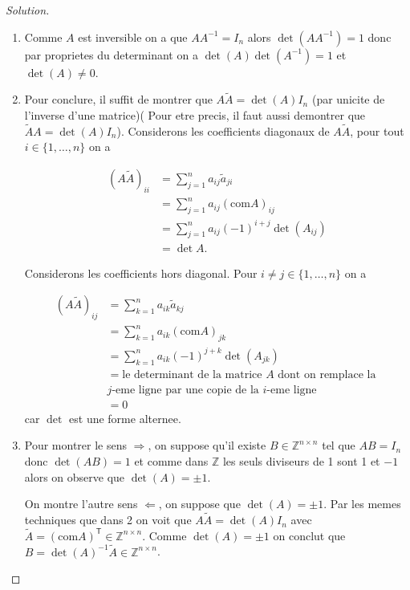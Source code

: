 \documentclass[a4paper,12pt,french]{report}
\theoremstyle{plain}
\theoremstyle{definition}
\begin{document}
\begin{proof}[Solution]
\begin{enumerate}
\item Comme $A$ est inversible on a que $AA^{-1}=I_{n}$ alors $\det(AA^{-1})=1$ donc par proprietes du determinant on a $\det(A)\det (A^{-1})=1$ et $\det(A)\neq 0$.
\item Pour conclure, il suffit de montrer que $A\tilde{A}=\det(A)I_{n}$ (par unicite de l'inverse d'une matrice)( Pour etre precis, il faut aussi demontrer que $\tilde{A}A=\det(A)I_{n}$). Considerons les coefficients diagonaux de $A\tilde{A}$, pour tout $i\in \{ 1,\dots ,n \}$ on a 

\begin{align*}
(A\tilde{A})_{ii} & =\sum_{j=1}^{n} a_{ij}\tilde{a}_{ji} \\
 & =\sum_{j=1}^{n} a_{ij}(\mathrm{com}A)_{ij} \\
 & =\sum_{j=1}^{n} a_{ij}(-1)^{i+j}\det(A_{ij}) \\
 & =\det A.
\end{align*}

Considerons les coefficients hors diagonal. Pour $i\neq j\in \{ 1,\dots,n \}$ on a

\begin{align*}
(A\tilde{A})_{ij} & =\sum_{k=1}^{n} a_{ik}\tilde{a}_{kj} \\
 & =\sum_{k=1}^{n} a_{ik}(\mathrm{com}A)_{jk} \\
 & =\sum_{k=1}^{n} a_{ik}(-1)^{j+k}\det(A_{jk}) \\
 & =\text{le determinant de la matrice }A\text{ dont on remplace la }\\&j\text{-eme ligne par une copie de la }i\text{-eme ligne} \\
 & =0
\end{align*}
car $\det$ est une forme alternee.
\item Pour montrer le sens $\Rightarrow$, on suppose qu'il existe $B\in \mathbb{Z}^{n\times n}$ tel que $AB=I_{n}$ donc $\det(AB)=1$ et comme dans $\mathbb{Z}$ les seuls diviseurs de 1 sont 1 et $-1$ alors on observe que $\det(A)=\pm1$.

On montre l'autre sens $\Leftarrow$, on suppose que $\det(A)=\pm1$. Par les memes techniques que dans 2 on voit que $A\tilde{A}=\det(A)I_{n}$ avec $\tilde{A}=(\mathrm{com}A)^{\mathsf{T}}\in \mathbb{Z}^{n\times n}$. Comme $\det(A)=\pm 1$ on conclut que $B=\det(A)^{-1}\tilde{A}\in \mathbb{Z}^{n\times n}$.
\end{enumerate}
\end{proof}
\end{document}
